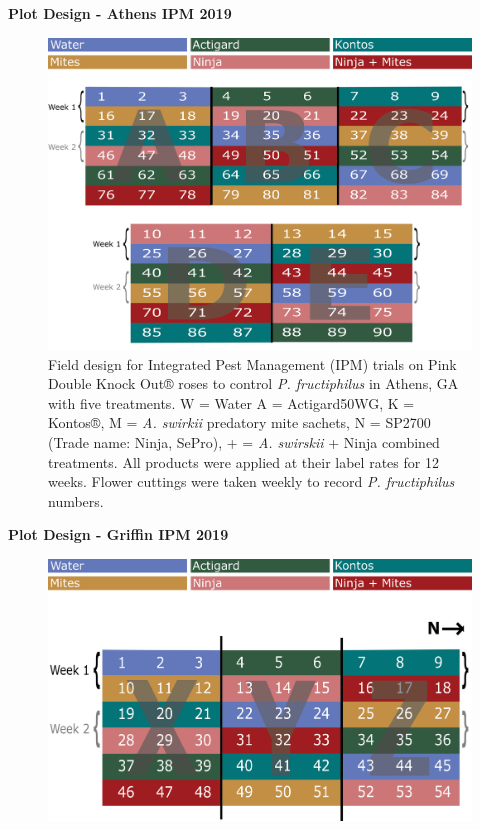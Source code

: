 \documentclass[12pt,final,CPage]{ufthesis}
\begin{document}
{  \textbf{Plot Design - Athens IPM 2019}
  \begin{figure}

  {\centering \includegraphics[width=0.8\linewidth]{figure/rrv_ipm_plot_map_2019_athens} 

  }

  \caption[Field design for Integrated Pest Management (IPM) trials on Pink Double Knock Out® roses to control \textit{P. fructiphilus} in Athens, GA with five treatments]{Field design for Integrated Pest Management (IPM) trials on Pink Double Knock Out® roses to control \textit{P. fructiphilus} in Athens, GA with five treatments. W = Water A = Actigard50WG, K = Kontos®, M = \textit{A. swirkii} predatory mite sachets, N = SP2700 (Trade name: Ninja, SePro), + = \textit{A. swirskii} + Ninja combined treatments. All products were applied at their label rates for 12 weeks. Flower cuttings were taken weekly to record \textit{P. fructiphilus} numbers.}\label{fig:athens-ipm-2019}
  \end{figure}
  \textbf{Plot Design - Griffin IPM 2019}
  \begin{figure}

  {\centering \includegraphics[width=0.8\linewidth]{figure/rrv_ipm_plot_map_2019_griffin} 

}
\end{figure}}
\end{document}
